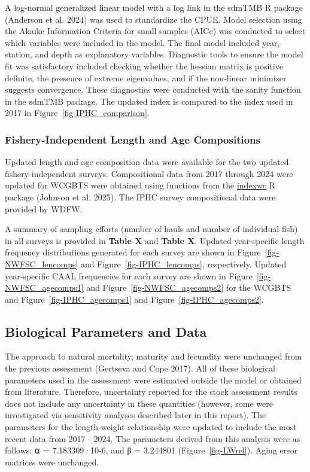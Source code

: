 \documentclass[
]{scrartcl}
\begin{document}
A log-normal generalized linear model with a log link in the sdmTMB R
package (Anderson et al. 2024) was used to standardize the CPUE. Model
selection using the Akaike Information Criteria for small samples (AICc)
was conducted to select which variables were included in the model. The
final model included year, station, and depth as explanatory variables.
Diagnostic tools to ensure the model fit was satisfactory included
checking whether the hessian matrix is positive definite, the presence
of extreme eigenvalues, and if the non-linear minimizer suggests
convergence. These diagnostics were conducted with the sanity function
in the sdmTMB package. The updated index is compared to the index used
in 2017 in Figure~\ref{fig-IPHC_comparison}.

\subsubsection{Fishery-Independent Length and Age
Compositions}\label{fishery-independent-length-and-age-compositions}

Updated length and age composition data were available for the two
updated fishery-independent surveys. Compositional data from 2017
through 2024 were updated for WCGBTS were obtained using functions from
the \href{https://github.com/pfmc-assessments/indexwc}{indexwc} R
package (Johnson et al. 2025). The IPHC survey compositional data were
provided by WDFW.

A summary of sampling efforts (number of hauls and number of individual
fish) in all surveys is provided in \textbf{Table X} and \textbf{Table
X}. Updated year-specific length frequency distributions generated for
each survey are shown in Figure~\ref{fig-NWFSC_lencomps} and
Figure~\ref{fig-IPHC_lencomps}, respectively. Updated year-specific CAAL
frequencies for each survey are shown in
Figure~\ref{fig-NWFSC_agecomps1} and Figure~\ref{fig-NWFSC_agecomps2}
for the WCGBTS and Figure~\ref{fig-IPHC_agecomps1} and
Figure~\ref{fig-IPHC_agecomps2}.

\subsection{Biological Parameters and
Data}\label{biological-parameters-and-data}

The approach to natural mortality, maturity and fecundity were unchanged
from the previous assessment (Gertseva and Cope 2017). All of these
biological parameters used in the assessment were estimated outside the
model or obtained from literature. Therefore, uncertainty reported for
the stock assessment results does not include any uncertainty in these
quantities (however, some were investigated via sensitivity analyses
described later in this report). The parameters for the length-weight
relationship were updated to include the most recent data from 2017 -
2024. The parameters derived from this analysis were as follows: ⍺ =
7.183309·10-6, and β = 3.244801 (Figure~\ref{fig-LWrel}). Aging error
matrices were unchanged.
\end{document}
